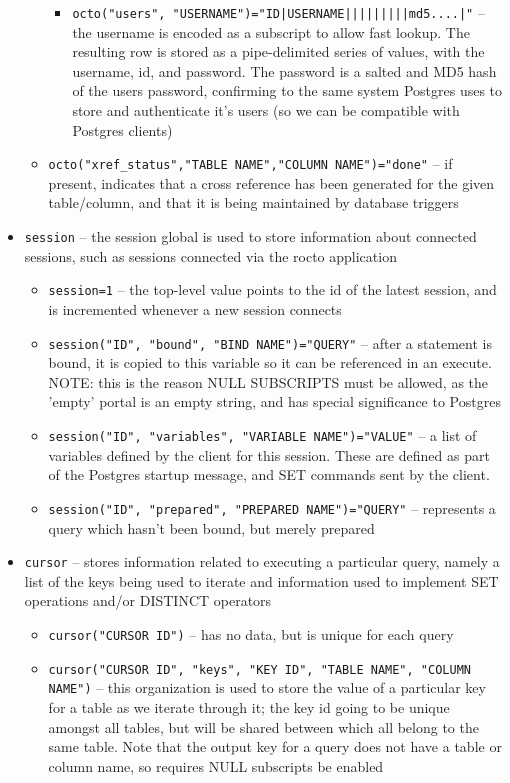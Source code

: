 \documentclass[]{article}
\def\code#1{\texttt{#1}}
\begin{document}
\begin{itemize}
\begin{itemize}
\begin{itemize}
			\item \code{octo("users", "USERNAME")="ID|USERNAME|||||||||md5....|"} -- the username is encoded as a subscript to allow fast lookup. The resulting row is stored as a pipe-delimited series of values, with the username, id, and password. The password is a salted and MD5 hash of the users password, confirming to the same system Postgres uses to store and authenticate it's users (so we can be compatible with Postgres clients)
		\end{itemize}
		\item \code{octo("xref\_status","TABLE NAME","COLUMN NAME")="done"} -- if present, indicates that a cross reference has been generated for the given table/column, and that it is being maintained by database triggers
	\end{itemize}
	\item \code{session} -- the session global is used to store information about connected sessions, such as sessions connected via the rocto application
	\begin{itemize}
		\item \code{session=1} -- the top-level value points to the id of the latest session, and is incremented whenever a new session connects
		\item \code{session("ID", "bound", "BIND NAME")="QUERY"} -- after a statement is bound, it is copied to this variable so it can be referenced in an execute. NOTE: this is the reason NULL SUBSCRIPTS must be allowed, as the 'empty' portal is an empty string, and has special significance to Postgres
		\item \code{session("ID", "variables", "VARIABLE NAME")="VALUE"} -- a list of variables defined by the client for this session. These are defined as part of the Postgres startup message, and SET commands sent by the client.
		\item \code{session("ID", "prepared", "PREPARED NAME")="QUERY"} -- represents a query which hasn't been bound, but merely prepared
	\end{itemize}
	\item \code{cursor} -- stores information related to executing a particular query, namely a list of the keys being used to iterate and information used to implement SET operations and/or DISTINCT operators
	\begin{itemize}
		\item \code{cursor("CURSOR ID")} -- has no data, but is unique for each query
		\item \code{cursor("CURSOR ID", "keys", "KEY ID", "TABLE NAME", "COLUMN NAME")} -- this organization is used to store the value of a particular key for a table as we iterate through it; the key id going to be unique amongst all tables, but will be shared between which all belong to the same table. Note that the output key for a query does not have a table or column name, so requires NULL subscripts be enabled

\end{itemize}
\end{itemize}
\end{document}
